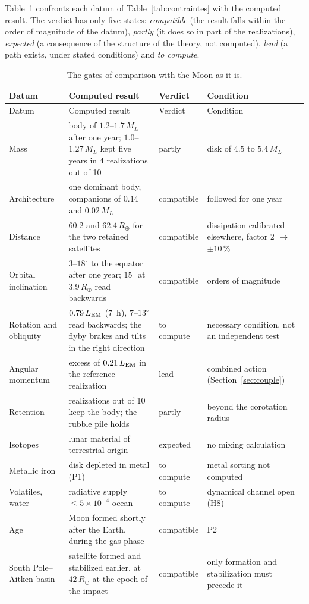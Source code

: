 \documentclass[11pt,a4paper]{article}
\newcommand{\Rt}{\ensuremath{R_\oplus}}
\newcommand{\ML}{\ensuremath{M_L}}
\newcommand{\LEM}{\ensuremath{L_{\rm EM}}}
\renewcommand{\arraystretch}{1.12}
\begin{document}
Table~\ref{tab:portes} confronts each datum of Table~\ref{tab:contraintes} with the computed result. The verdict has only five states: \emph{compatible} (the result falls within the order of magnitude of the datum), \emph{partly} (it does so in part of the realizations), \emph{expected} (a consequence of the structure of the theory, not computed), \emph{lead} (a path exists, under stated conditions) and \emph{to compute}.

{\footnotesize\renewcommand{\arraystretch}{0.9}
\begin{longtable}{>{\raggedright\arraybackslash}p{2.4cm}>{\raggedright\arraybackslash}p{6.6cm}>{\raggedright\arraybackslash}p{2.0cm}>{\raggedright\arraybackslash}p{3.4cm}}
\caption{The gates of comparison with the Moon as it is.\label{tab:portes}}\\
\toprule
Datum & Computed result & Verdict & Condition \\
\midrule
\endfirsthead
\toprule
Datum & Computed result & Verdict & Condition \\
\midrule
\endhead
\bottomrule
\endlastfoot
Mass & body of $1.2$--$1.7\,\ML$ after one year; $1.0$--$1.27\,\ML$ kept five years in 4 realizations out of 10 & partly & disk of $4.5$ to $5.4\,\ML$ \\
Architecture & one dominant body, companions of $0.14$ and $0.02\,\ML$ & compatible & followed for one year \\
Distance & $60.2$ and $62.4\,\Rt$ for the two retained satellites & compatible & dissipation calibrated elsewhere, factor $2$ $\to$ $\pm10\,\%$ \\
Orbital inclination & $3$--$18^\circ$ to the equator after one year; $15^\circ$ at $3.9\,\Rt$ read backwards & compatible & orders of magnitude \\
Rotation and obliquity & $0.79\,\LEM$ ($7$~h), $7$--$13^\circ$ read backwards; the flyby brakes and tilts in the right direction & to compute & necessary condition, not an independent test \\
Angular momentum & excess of $0.21\,\LEM$ in the reference realization & lead & combined action (Section~\ref{sec:couple}) \\
Retention & 4 realizations out of 10 keep the body; the rubble pile holds & partly & beyond the corotation radius \\
Isotopes & lunar material of terrestrial origin & expected & no mixing calculation \\
Metallic iron & disk depleted in metal (P1) & to compute & metal sorting not computed \\
Volatiles, water & radiative supply $\le5\times10^{-4}$ ocean & to compute & dynamical channel open (H8) \\
Age & Moon formed shortly after the Earth, during the gas phase & compatible & P2 \\
South Pole--Aitken basin & satellite formed and stabilized earlier, at $42\,\Rt$ at the epoch of the impact & compatible & only formation and stabilization must precede it \\
\end{longtable}}
\end{document}
